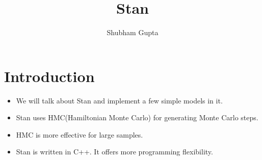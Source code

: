 \documentclass[a4paper]{article}
\title{Stan}
\author{Shubham Gupta}
\begin{document}
\maketitle

\section{Introduction}
\begin{itemize}
    \item We will talk about Stan and implement a few simple models in it.
    \item Stan uses HMC(Hamiltonian Monte Carlo) for generating Monte Carlo steps.
    \item HMC is more effective for large samples.
    \item Stan is written in C++. It offers more programming flexibility.
\end{itemize}
\end{document}
